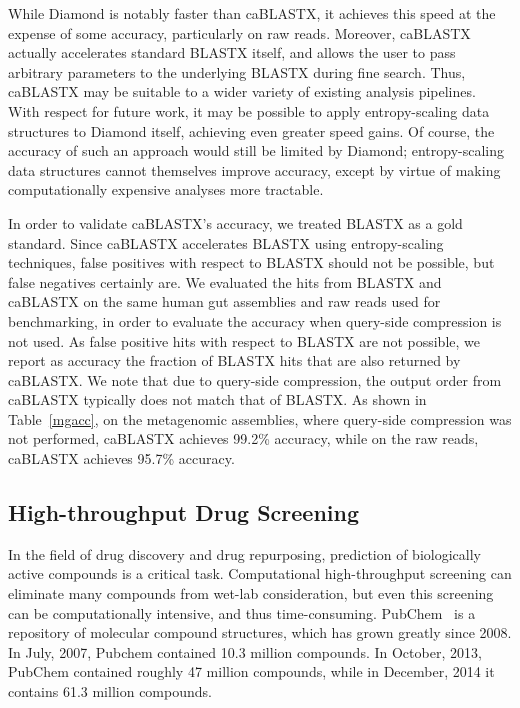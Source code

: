 \documentclass[review,preprint,12pt]{elsarticle}
\renewcommand{\cite}{\citep} %
\theoremstyle{definition}
\theoremstyle{remark}
\numberwithin{equation}{section}
\begin{document}
While Diamond is notably faster than caBLASTX, it achieves this speed at the
expense of some accuracy, particularly on raw reads.
Moreover, caBLASTX actually accelerates standard BLASTX itself, and allows the
user to pass arbitrary parameters to the underlying BLASTX during fine search.
Thus, caBLASTX may be suitable to a wider variety of existing analysis 
pipelines.
With respect for future work, it may be possible to apply entropy-scaling data
structures to Diamond itself, achieving even greater speed gains.
Of course, the accuracy of such an approach would still be limited by Diamond; 
entropy-scaling data structures cannot themselves improve accuracy,
except by virtue of making computationally expensive analyses more tractable.


In order to validate caBLASTX's accuracy, we treated BLASTX as a gold standard. 
Since caBLASTX accelerates BLASTX
using entropy-scaling techniques, false positives with respect to BLASTX should 
not be possible, but false negatives certainly are.
We evaluated the hits from BLASTX and caBLASTX on the same human gut
assemblies and raw reads used for benchmarking, in order to evaluate the accuracy when
query-side compression is not used.
As false positive hits with respect to BLASTX are not possible, we report as 
accuracy the fraction of BLASTX hits that are also returned by caBLASTX.
We note that due to query-side compression, the output order from caBLASTX 
typically does not match that of BLASTX.
As shown in Table~\ref{mgacc}, on the metagenomic assemblies, where query-side 
compression was not performed, caBLASTX achieves 99.2\% accuracy, while on the 
raw reads, caBLASTX achieves 95.7\% accuracy.


\subsection{High-throughput Drug Screening}

In the field of drug discovery and drug repurposing, prediction of biologically 
active compounds is a critical task. 
Computational high-throughput screening can eliminate many compounds from 
wet-lab consideration, but even this screening can be computationally 
intensive, and thus time-consuming.
PubChem~\cite{bolton2008pubchem} is a repository of molecular compound 
structures, 
which has grown greatly since 2008. 
In July, 2007, Pubchem contained 10.3 million compounds.
In October, 2013, PubChem contained roughly 47 million compounds, while
in December, 2014 it contains 61.3 million compounds.
\end{document}
